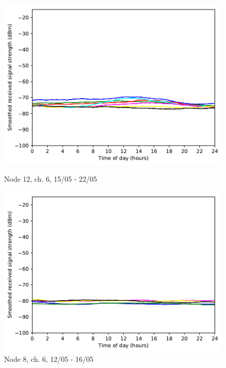 \documentclass[a4paper, 11pt]{article}
\begin{document}
\begin{figure}[!h]
\begin{minipage}{0.47\textwidth}
    \centering
	\includegraphics[width=\textwidth]{images/2_4_GHz/cot-node12-student_2017-05-22_chan6_image}
    \caption{Node 12, ch. 6, 15/05 - 22/05} \label{node12-6}
\end{minipage}\hfill
\begin{minipage}{0.47\textwidth}
    \centering
	\includegraphics[width=\textwidth]{images/2_4_GHz/cot-node8-student_2017-05-16_chan6_image}
    \caption{Node 8, ch. 6, 12/05 - 16/05} \label{node8-6}
\end{minipage}\hfill
\end{figure}
\end{document}

